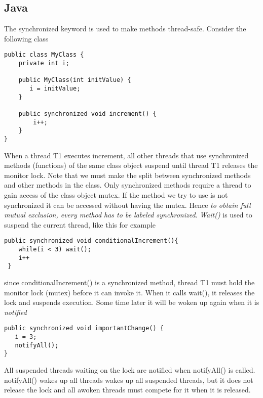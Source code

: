 \subsection{Java}
The synchronized keyword is used to make methods thread-safe. Consider the following class
\begin{verbatim}
public class MyClass {
	private int i;
   
    public MyClass(int initValue) {
       i = initValue;
    }
   
    public synchronized void increment() {
        i++;
    }
}
\end{verbatim}
When a thread T1 executes increment, all other threads that use synchronized methods (functions) of the same class object suspend until thread T1 releases the monitor lock. Note that we must make the split between synchronized methods and other methods in the class. Only synchronized methods require a thread to gain access of the class object mutex. If the method we try to use is not synchronized it can be accessed without having the mutex. Hence \textit{to obtain full mutual exclusion, every method has to be labeled synchronized}. 
\textit{Wait()} is used to suspend the current thread, like this for example
\begin{verbatim}
public synchronized void conditionalIncrement(){
    while(i < 3) wait();
    i++
 }   
\end{verbatim}
since conditionalIncrement() is a synchronized method, thread T1 must hold the monitor lock (mutex) before it can invoke it. When it calls wait(), it releases the lock and suspends execution. Some time later it will be woken up again when it is \textit{notified}
\begin{verbatim}
public synchronized void importantChange() {
   i = 3;
   notifyAll();
}
\end{verbatim}
All suspended threads waiting on the lock are notified when notifyAll() is called. notifyAll() wakes up all threads wakes up all suspended threads, but it does not release the lock and all awoken threads must compete for it when it is released.

